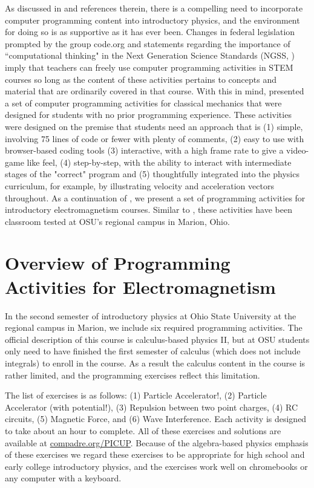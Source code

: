 \documentclass[aps,prd,10pt,twocolumn,showpacs,preprintnumbers,amsmath,amssymb,nofootinbib,floatfix]{revtex4-1}
\begin{document}
As discussed in \cite{Orban_etal2017,Sherin2001,Landau_etal2011} and references therein, there is a compelling need to incorporate computer programming content into introductory physics, and the environment for doing so is as supportive as it has ever been. Changes in federal legislation prompted by the group code.org and statements regarding the importance of ``computational thinking" in the Next Generation Science Standards (NGSS, \cite{NGSS}) imply that teachers can freely use computer programming activities in STEM courses so long as the content of these activities pertains to concepts and material that are ordinarily covered in that course. With this in mind, \citet{Orban_etal2017} presented a set of computer programming activities for classical mechanics that were designed for students with no prior programming experience. These activities were designed on the premise that students need an approach that is (1) simple, involving 75 lines of code or fewer with plenty of comments, (2) easy to use with browser-based coding tools (3) interactive, with a high frame rate to give a video-game like feel, (4) step-by-step, with the ability to interact with intermediate stages of the "correct" program and (5) thoughtfully integrated into the physics curriculum, for example, by illustrating velocity and acceleration vectors throughout. As a continuation of \cite{Orban_etal2017}, we present a set of programming activities for introductory electromagnetism courses. Similar to \cite{Orban_etal2017}, these activities have been classroom tested at OSU's regional campus in Marion, Ohio.

\section{Overview of Programming Activities for Electromagnetism}

In the second semester of introductory physics at Ohio State University at the regional campus in Marion, we include six required programming activities. The official description of this course is calculus-based physics II, but at OSU students only need to have finished the first semester of calculus (which does not include integrals) to enroll in the course. As a result the calculus content in the course is rather limited, and the programming exercises reflect this limitation. 

The list of exercises is as follows: (1) Particle Accelerator!, (2) Particle Accelerator (with potential!), (3) Repulsion between two point charges, (4) RC circuits, (5) Magnetic Force, and (6) Wave Interference. Each activity is designed to take about an hour to complete. All of these exercises and solutions are available at \href{http://compadre.org/PICUP}{compadre.org/PICUP}.   Because of the algebra-based physics emphasis of these exercises we regard these exercises to be appropriate for high school and early college introductory physics, and the exercises work well on chromebooks or any computer with a keyboard.  %
\end{document}
